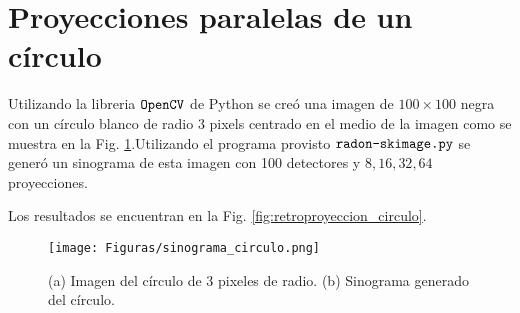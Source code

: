 \documentclass[letterpaper,12pt]{article}
\theoremstyle{plain}
\begin{document}
\section{Proyecciones paralelas de un círculo}

Utilizando la libreria $\verb|OpenCV|$ de Python se creó una imagen de $100\times100$ negra con un círculo blanco de radio $3$ pixels centrado en el medio de la imagen como se muestra en la Fig. \ref{fig:sinograma_circulo}.Utilizando el programa provisto $\verb|radon-skimage.py|$ se generó un sinograma de esta imagen con 100 detectores y $8,16,32,64$ proyecciones. 


Los resultados se encuentran en la Fig. \ref{fig:retroproyeccion_circulo}.

\begin{figure}[H]
   \centering
         \texttt{[image: Figuras/sinograma\_circulo.png]}
   \caption{(a) Imagen del círculo de 3 pixeles de radio. (b) Sinograma generado del círculo. }
   \label{fig:sinograma_circulo}
\end{figure}
\end{document}
